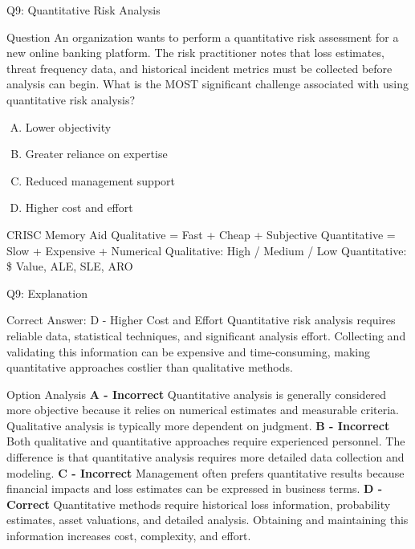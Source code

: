 \documentclass{beamer}
\begin{document}
	\begin{frame}{Q9: Quantitative Risk Analysis} \begin{block}{Question} An organization wants to perform a quantitative risk assessment for a new online banking platform. The risk practitioner notes that loss estimates, threat frequency data, and historical incident metrics must be collected before analysis can begin. What is the MOST significant challenge associated with using quantitative risk analysis? \end{block} \begin{enumerate}[(A)] \item Lower objectivity \item Greater reliance on expertise \item Reduced management support \item Higher cost and effort \end{enumerate}  \begin{block}{CRISC Memory Aid} Qualitative = Fast + Cheap + Subjective Quantitative = Slow + Expensive + Numerical \vspace{0.15cm} Qualitative: High / Medium / Low Quantitative: \$ Value, ALE, SLE, ARO \end{block} \end{frame} \begin{frame}{Q9: Explanation} \footnotesize \begin{block}{Correct Answer: D - Higher Cost and Effort} Quantitative risk analysis requires reliable data, statistical techniques, and significant analysis effort. Collecting and validating this information can be expensive and time-consuming, making quantitative approaches costlier than qualitative methods. \end{block} \begin{block}{Option Analysis} \textbf{A - Incorrect} Quantitative analysis is generally considered more objective because it relies on numerical estimates and measurable criteria. Qualitative analysis is typically more dependent on judgment. \vspace{0.15cm} \textbf{B - Incorrect} Both qualitative and quantitative approaches require experienced personnel. The difference is that quantitative analysis requires more detailed data collection and modeling. \vspace{0.15cm} \textbf{C - Incorrect} Management often prefers quantitative results because financial impacts and loss estimates can be expressed in business terms. \vspace{0.15cm} \textbf{D - Correct} Quantitative methods require historical loss information, probability estimates, asset valuations, and detailed analysis. Obtaining and maintaining this information increases cost, complexity, and effort. \end{block} \end{frame}
	
\end{document}
